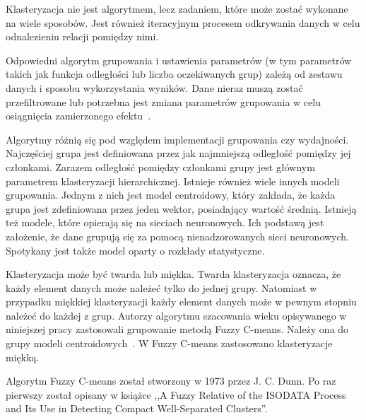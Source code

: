 \documentclass[a4paper,twoside,12pt]{book}
\begin{document}
    Klasteryzacja nie jest algorytmem, lecz zadaniem, które może zostać wykonane na wiele sposobów.
    Jest również iteracyjnym procesem odkrywania danych w celu odnalezieniu relacji pomiędzy nimi.

    Odpowiedni algorytm grupowania i ustawienia parametrów (w tym parametrów
    takich jak funkcja odległości lub liczba oczekiwanych grup)
    zależą od zestawu danych i sposobu wykorzystania wyników.
    Dane nieraz muszą zostać przefiltrowane lub potrzebna jest zmiana parametrów grupowania w celu osiągnięcia
    zamierzonego efektu~\cite{clusterWstep}.

    Algorytmy różnią się pod względem implementacji grupowania czy wydajności.
    Najczęściej grupa jest definiowana przez jak najmniejszą odległość pomiędzy jej członkami.
    Zarazem odległość pomiędzy członkami grupy jest głównym parametrem klasteryzacji hierarchicznej.
    Istnieje również wiele innych modeli grupowania.
    Jednym z nich jest model centroidowy,
    który zakłada, że każda grupa jest zdefiniowana przez jeden wektor, posiadający wartość średnią.
    Istnieją też modele, które opierają się na sieciach neuronowych.
    Ich podstawą jest założenie, że dane grupują się za pomocą nienadzorowanych sieci neuronowych.
    Spotykany jest także model oparty o rozkłady statystyczne.

    Klasteryzacja może być twarda lub miękka.
    Twarda klasteryzacja oznacza, że każdy element danych może należeć tylko do jednej grupy.
    Natomiast w przypadku miękkiej klasteryzacji każdy element danych może w pewnym stopniu należeć do każdej z grup.
    Autorzy algorytmu szacowania wieku opisywanego w niniejszej pracy zastosowali grupowanie metodą Fuzzy C-means.
    Należy ona do grupy modeli centroidowych~\cite{clusterWstep}. W Fuzzy C-means zastosowano klasteryzacje miękką.

    Algorytm Fuzzy C-means został stworzony w 1973 przez J. C. Dunn. Po raz pierwszy został opisany w książce
    ,,A Fuzzy Relative of the ISODATA Process and Its Use in Detecting Compact Well-Separated Clusters''.
\end{document}
